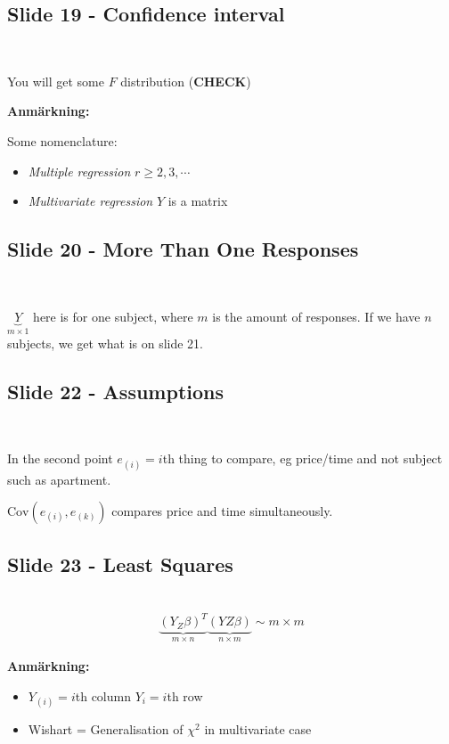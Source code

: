 \subsection{Slide 19 - Confidence interval}\hfill\\\par
\noindent You will get some $F$ distribution (\textbf{CHECK})
\par\bigskip
\noindent\textbf{Anmärkning:}\par
\noindent Some nomenclature:\par
\begin{itemize}
  \item \textit{Multiple regression} $r\geq2,3,\cdots$
  \item \textit{Multivariate regression} $Y$ is a matrix
\end{itemize}
\par\bigskip
\subsection{Slide 20 - More Than One Responses}\hfill\\\par
\noindent $\underbrace{Y}_{m\times1}$ here is for one subject, where $m$  is the amount of responses. If we have $n$ subjects, we get what is on slide 21.
\par\bigskip
\subsection{Slide 22 - Assumptions}\hfill\\\par
\noindent In the second point $e_{(i)} = i$th thing to compare, eg price/time and not subject such as apartment.\par
\noindent $\text{Cov}\left(e_{(i)}, e_{(k)}\right)$ compares price and time simultaneously.
\par\bigskip
\subsection{Slide 23 - Least Squares}\hfill\\
\begin{equation*}
  \begin{gathered}
    \underbrace{(Y_Z\beta)^T}_{m\times n}\underbrace{(YZ\beta)}_{n\times m}\sim m\times m
  \end{gathered}
\end{equation*}
\par\bigskip
\noindent\textbf{Anmärkning:}\par
\begin{itemize}
  \item $Y_{(i)} = i$th column $Y_i = i$th row
  \item Wishart = Generalisation of $\chi^2$ in multivariate case
\end{itemize}
\par\bigskip
